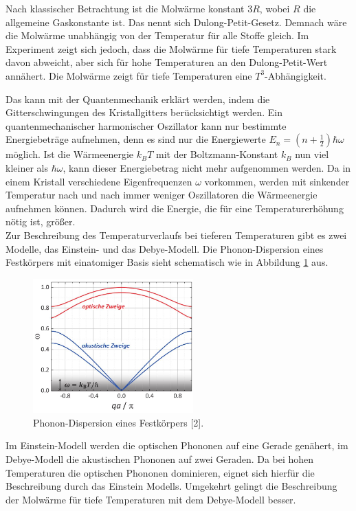 Nach klassischer Betrachtung ist die Molwärme konstant $3R$, wobei $R$ die allgemeine Gaskonstante ist. Das nennt sich Dulong-Petit-Gesetz. 
Demnach wäre die Molwärme unabhängig von der Temperatur für alle Stoffe gleich. 
Im Experiment zeigt sich jedoch, dass die Molwärme für tiefe Temperaturen stark davon abweicht, aber sich für 
hohe Temperaturen an den Dulong-Petit-Wert annähert. Die Molwärme zeigt für tiefe Temperaturen eine $T^3$-Abhängigkeit. 


Das kann mit der Quantenmechanik erklärt werden, indem die Gitterschwingungen des Kristallgitters 
berücksichtigt werden. Ein quantenmechanischer harmonischer Oszillator kann nur bestimmte Energiebeträge aufnehmen, 
denn es sind nur die Energiewerte $ E_{\si{n}} = (n+\frac{1}{2}) \hbar \omega $ möglich. Ist die Wärmeenergie $k_{\si{B}}T$ mit der Boltzmann-Konstant $k_{\si{B}}$
nun viel kleiner als $\hbar\omega$, kann dieser Energiebetrag nicht mehr aufgenommen werden. 
Da in einem Kristall verschiedene Eigenfrequenzen $\omega$ vorkommen, werden mit sinkender Temperatur nach und nach immer weniger 
Oszillatoren die Wärmeenergie aufnehmen können. Dadurch wird die Energie, die für eine Temperaturerhöhung nötig ist, größer. 
\\

Zur Beschreibung des Temperaturverlaufs bei tieferen Temperaturen gibt es zwei Modelle, das Einstein- und das Debye-Modell. 
Die Phonon-Dispersion eines Festkörpers mit einatomiger Basis sieht schematisch wie in Abbildung \ref{fig:2} aus. 
\FloatBarrier
\begin{figure}
  \centering
  \includegraphics[width=0.55\textwidth]{2.JPG}
  \caption{Phonon-Dispersion eines Festkörpers [2].}
  \label{fig:2}
\end{figure}
\FloatBarrier
Im Einstein-Modell werden die optischen Phononen auf eine Gerade genähert,
im Debye-Modell die akustischen Phononen auf zwei Geraden. Da bei hohen Temperaturen die optischen Phononen dominieren,
eignet sich hierfür die Beschreibung durch das Einstein Modells. Umgekehrt gelingt die Beschreibung der Molwärme für tiefe Temperaturen mit dem Debye-Modell besser.
\\

